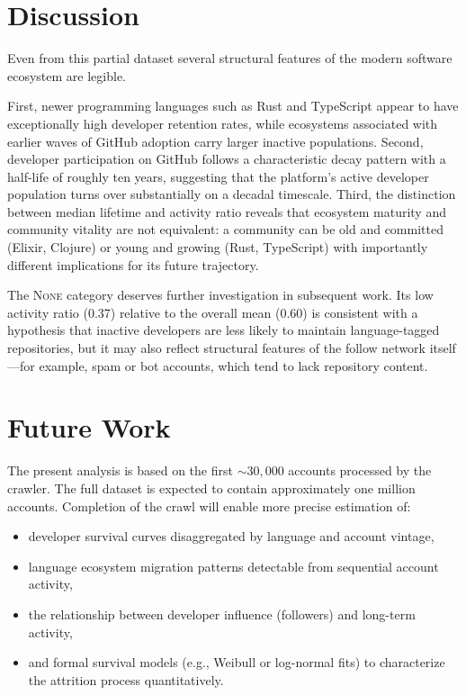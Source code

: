 \documentclass[12pt,a4paper]{article}
\begin{document}
\section{Discussion}

Even from this partial dataset several structural features of the modern software
ecosystem are legible.

First, newer programming languages such as Rust and TypeScript appear to have
exceptionally high developer retention rates, while ecosystems associated with
earlier waves of GitHub adoption carry larger inactive populations. Second,
developer participation on GitHub follows a characteristic decay pattern with a
half-life of roughly ten years, suggesting that the platform's active developer
population turns over substantially on a decadal timescale. Third, the
distinction between median lifetime and activity ratio reveals that ecosystem
maturity and community vitality are not equivalent: a community can be old and
committed (Elixir, Clojure) or young and growing (Rust, TypeScript) with
importantly different implications for its future trajectory.

The \textsc{None} category deserves further investigation in subsequent work. Its
low activity ratio (0.37) relative to the overall mean (0.60) is consistent with
a hypothesis that inactive developers are less likely to maintain language-tagged
repositories, but it may also reflect structural features of the follow network
itself---for example, spam or bot accounts, which tend to lack repository
content.

\section{Future Work}

The present analysis is based on the first $\sim30{,}000$ accounts processed by
the crawler. The full dataset is expected to contain approximately one million
accounts. Completion of the crawl will enable more precise estimation of:
\begin{itemize}
\item developer survival curves disaggregated by language and account vintage,
\item language ecosystem migration patterns detectable from sequential account activity,
\item the relationship between developer influence (followers) and long-term activity,
\item and formal survival models (e.g., Weibull or log-normal fits) to characterize
      the attrition process quantitatively.
\end{itemize}
\end{document}
